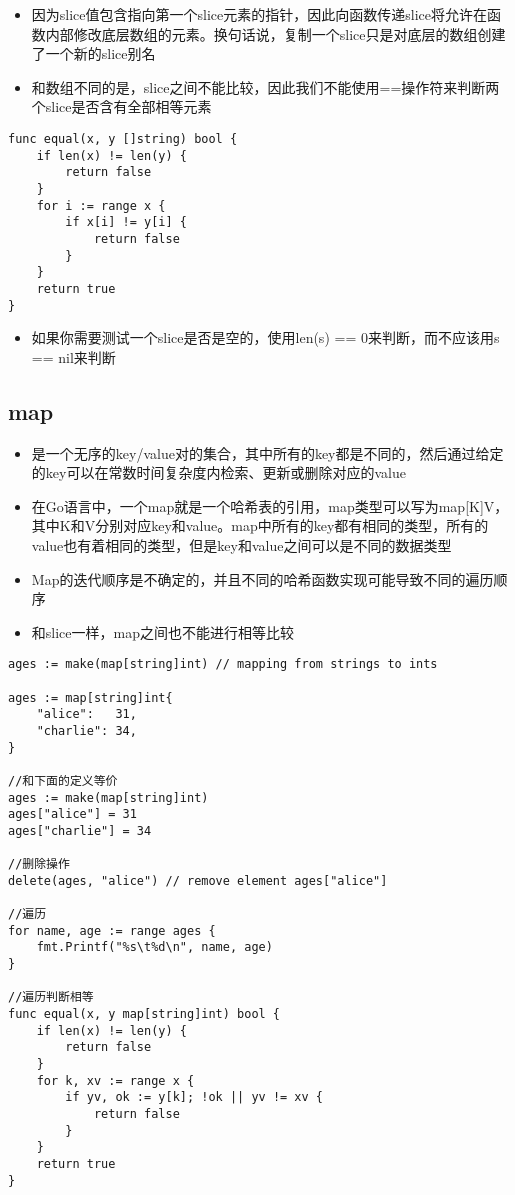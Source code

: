 \begin{itemize}
\tightlist
\item
  因为slice值包含指向第一个slice元素的指针，因此向函数传递slice将允许在函数内部修改底层数组的元素。换句话说，复制一个slice只是对底层的数组创建了一个新的slice别名
\item
  和数组不同的是，slice之间不能比较，因此我们不能使用==操作符来判断两个slice是否含有全部相等元素
\end{itemize}

\begin{verbatim}
func equal(x, y []string) bool {
    if len(x) != len(y) {
        return false
    }
    for i := range x {
        if x[i] != y[i] {
            return false
        }
    }
    return true
}
\end{verbatim}

\begin{itemize}
\tightlist
\item
  如果你需要测试一个slice是否是空的，使用len(s) == 0来判断，而不应该用s
  == nil来判断
\end{itemize}

\hypertarget{map}{%
\subsection{map}\label{map}}

\begin{itemize}
\tightlist
\item
  是一个无序的key/value对的集合，其中所有的key都是不同的，然后通过给定的key可以在常数时间复杂度内检索、更新或删除对应的value
\item
  在Go语言中，一个map就是一个哈希表的引用，map类型可以写为map{[}K{]}V，其中K和V分别对应key和value。map中所有的key都有相同的类型，所有的value也有着相同的类型，但是key和value之间可以是不同的数据类型
\item
  Map的迭代顺序是不确定的，并且不同的哈希函数实现可能导致不同的遍历顺序
\item
  和slice一样，map之间也不能进行相等比较
\end{itemize}

\begin{verbatim}
ages := make(map[string]int) // mapping from strings to ints

ages := map[string]int{
    "alice":   31,
    "charlie": 34,
}

//和下面的定义等价
ages := make(map[string]int)
ages["alice"] = 31
ages["charlie"] = 34

//删除操作
delete(ages, "alice") // remove element ages["alice"]

//遍历
for name, age := range ages {
    fmt.Printf("%s\t%d\n", name, age)
}

//遍历判断相等
func equal(x, y map[string]int) bool {
    if len(x) != len(y) {
        return false
    }
    for k, xv := range x {
        if yv, ok := y[k]; !ok || yv != xv {
            return false
        }
    }
    return true
}
\end{verbatim}

